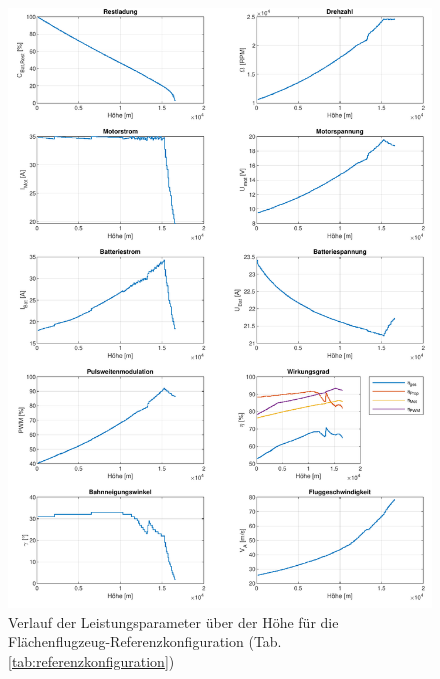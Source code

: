 \begin{figure}[htb!]
	\includegraphics[scale=0.7]{Diagramme/Ausgangskonstellation.pdf}
	\caption{Verlauf der Leistungsparameter über der Höhe für die Flächenflugzeug-Referenzkonfiguration (Tab. \ref{tab:referenzkonfiguration})}
	\label{abb:referenzkonfiguration}
\end{figure}
